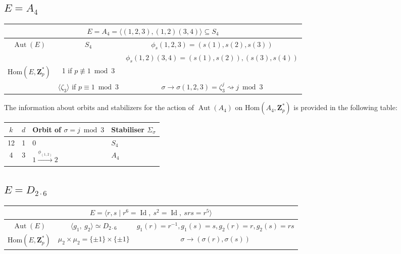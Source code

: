 \documentclass[12pt]{article}
\theoremstyle{definition}
\newcommand{\Z}{\mathbf Z}
\newcommand{\Hom}{\mathrm{Hom}}
\newcommand{\Aut}{\operatorname{Aut}}
\newcommand{\Id}{\operatorname{Id}}
\begin{document}
	
	\subsection{$E=A_4$}\label{A4}


    \begin{center}
    \begin{tabular}{|c|c|c|}
\multicolumn{3}{c}{$E=A_4=\langle (1,2,3), (1,2)(3,4)\rangle\subseteq S_4 $}\\[1ex]
\hline
$\Aut(E) $&$S_4$ &
	$
	\phi_s(1,2,3)=(s(1),s(2),s(3))$\\
    & &  $\phi_s(1,2)(3,4)=(s(1),s(2)),(s(3),s(4))$\\[1ex]
$\Hom(E,\Z_p^*)$ & 1 if $p\not\equiv 1\bmod 3$ & \\
&$\langle \zeta_3\rangle$ if $p\equiv 1\bmod 3$ &
$\sigma \to \sigma(1,2,3)=\zeta_3^j \rightsquigarrow j\bmod 3$\\
\hline
\end{tabular}
  \end{center} 

    The information about orbits and stabilizers for the action of $\Aut(A_4)$ on $\Hom(A_4,\Z_p^*)$ is provided in the following table:
	\begin{center}
		\begin{tabular}{c|c|l|l}
			$k$ & $ d$ & Orbit of $\sigma=j \bmod 3$ & Stabiliser $\Sigma_{\sigma}$ \\
			\hline
			12 &1 & $0$   & $S_4$\\
			4&3 & $1\xrightarrow{\phi_{(1,2)}}2$ & $A_4$\\
		\end{tabular}
	\end{center}
	
	
	\subsection{$E=D_{2\cdot 6}$}\label{D26}

      \begin{center}
    \begin{tabular}{|c|c|c|}
\multicolumn{3}{c}{$E=\langle r,s \mid r^6=\Id,\ s^2=\Id,\ srs=r^5 \rangle$}\\[1ex]
\hline
$\Aut(E) $&$\langle g_1,\ g_2\rangle\simeq D_{2\cdot 6}$ &
	 $g_1(r)=r^{-1},g_1(s)=s,g_2(r)=r,g_2(s)=rs$\\[1ex] 
$\Hom(E,\Z_p^*)$ & $\mu_{2}\times \mu_2=\{\pm 1 \} \times \{\pm 1 \}$& $\sigma \to  (\sigma(r),\sigma(s))$\\
\hline
\end{tabular}
  \end{center} 
	
\end{document}
